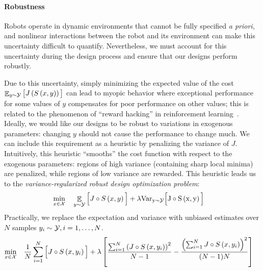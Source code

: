\paragraph{Robustness} Robots operate in dynamic environments that cannot be fully specified \textit{a priori}, and nonlinear interactions between the robot and its environment can make this uncertainty difficult to quantify. Nevertheless, we must account for this uncertainty during the design process and ensure that our designs perform robustly.

Due to this uncertainty, simply minimizing the expected value of the cost $\mathop{\mathbb{E}}_{y \sim \mathcal{Y}} \big[ J\left( S\left( x, y \right) \right) \big]$ can lead to myopic behavior where exceptional performance for some values of $y$ compensates for poor performance on other values; this is related to the phenomenon of ``reward hacking'' in reinforcement learning~\cite{amodei2016_ai_safety}. Ideally, we would like our designs to be robust to variations in exogenous parameters: changing $y$ should not cause the performance to change much. We can include this requirement as a heuristic by penalizing the variance of $J$. Intuitively, this heuristic ``smooths'' the cost function with respect to the exogenous parameters: regions of high variance (containing sharp local minima) are penalized, while regions of low variance are rewarded. This heuristic leads us to the \textit{variance-regularized robust design optimization problem}:
\begin{subequations}\label{app:ch5:eq:design_optimization_nlp_generic}
    \begin{align}
        \min_{x \in \mathcal{X}} & \quad \mathop{\mathbb{E}}_{y \sim \mathcal{Y}} \Big[ J\circ S\left( x, y \right) \Big] + \lambda \rm{Var}_{y\sim\mathcal{Y}}\Big[ J\circ S\left( x, y \right) \Big] \label{app:ch5:eq:design_optimization_objective_generic}
    \end{align}
\end{subequations}
Practically, we replace the expectation and variance with unbiased estimates over $N$ samples $y_i \sim \mathcal{Y}, i=1,\ldots,N$.
\begin{subequations}\label{app:ch5:eq:design_optimization_nlp}
    \begin{align}
        \min_{x \in \mathcal{X}} & \quad \frac{1}{N}\sum_{i=1}^{N} \Big[J\circ S\left( x, y_i \right)\Big] + \lambda \left[ \frac{\sum_{i=1}^N \left( J\circ S\left( x, y_i \right) \right)^2}{N-1} - \frac{\left( \sum_{i=1}^N J\circ S\left( x, y_i \right) \right)^2}{(N-1)N} \right] \label{app:ch5:eq:design_optimization_objective}
    \end{align}
\end{subequations}

